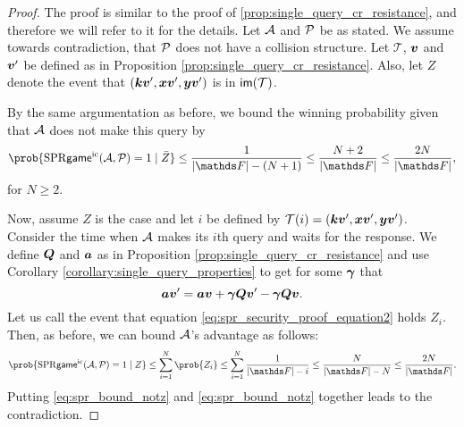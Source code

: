 \begin{proof}
    The proof is similar to the proof of \ref{prop:single_query_cr_resistance},
    and therefore we will refer to it for the details.
    Let $\A$ and $\P$ be as stated.
    We assume towards contradiction, that $\P$ does not have a collision structure.
    Let $\mathcal{T}$, $\vv$ and $\vv'$ be defined as in Proposition \ref{prop:single_query_cr_resistance}.
    Also, let $Z$ denote the event that $(\vk\vv', \vx\vv', \vy\vv')$ is in $\im(\mathcal{T})$.

    By the same argumentation as before, we bound the winning probability given that $\A$ does not make this query by
    \begin{equation}
    \label{eq:spr_bound_notz}
        \prob{\sprgame(\A, \P) = 1 \mid \bar{Z}} \leq \frac{1}{|\F| - (N+1)} \leq \frac{N+2}{|\F|} \leq \frac{2N}{|\F|},
    \end{equation}
    for $N \geq 2$.

    Now, assume $Z$ is the case and let $i$ be defined by $\mathcal{T}(i) = (\vk\vv', \vx\vv', \vy\vv')$.
    Consider the time when $\A$ makes its $i$th query and waits for the response.
    We define $\Q$ and $\va$ as in Proposition \ref{prop:single_query_cr_resistance} and
    use Corollary \ref{corollary:single_query_properties} to get for some $\v\gamma$ that
    \begin{equation}
    \label{eq:spr_security_proof_equation2}
    \va \vv' = \va\vv + \v\gamma \Q \vv' - \v\gamma \Q\vv.
    \end{equation}
    Let us call the event that equation \eqref{eq:spr_security_proof_equation2} holds $Z_i$.
    Then, as before, we can bound $\A$'s advantage as follows:
    \begin{equation}
    \label{eq:spr_bound_z}
    \prob{\sprgame(\A, \P) = 1 \mid Z}
    \leq \sum_{i=1}^{N} \prob{Z_i}
    \leq \sum_{i=1}^{N} \frac{1}{|\F| - i}
    \leq \frac{N}{|\F| - N}
    \leq \frac{2N}{|\F|}.
    \end{equation}
    Putting \eqref{eq:spr_bound_notz} and \eqref{eq:spr_bound_notz} together leads to the contradiction.
\end{proof}

